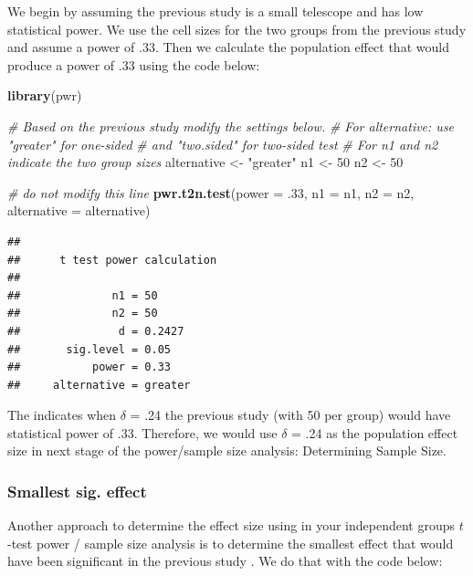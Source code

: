 \documentclass[
]{krantz}
\makeatletter
\newenvironment{Shaded}{\begin{snugshade}}{\end{snugshade}}
\newcommand{\CommentTok}[1]{\textcolor[rgb]{0.37,0.37,0.37}{\textit{#1}}}
\newcommand{\DataTypeTok}[1]{\textcolor[rgb]{0.27,0.27,0.27}{#1}}
\newcommand{\DecValTok}[1]{\textcolor[rgb]{0.06,0.06,0.06}{#1}}
\newcommand{\FloatTok}[1]{\textcolor[rgb]{0.06,0.06,0.06}{#1}}
\newcommand{\KeywordTok}[1]{\textcolor[rgb]{0.27,0.27,0.27}{\textbf{#1}}}
\newcommand{\NormalTok}[1]{#1}
\newcommand{\StringTok}[1]{\textcolor[rgb]{0.5,0.5,0.5}{#1}}
\newenvironment{kframe}{%
\medskip{}
\setlength{\fboxsep}{.8em}
 \def\at@end@of@kframe{}%
 \ifinner\ifhmode%
  \def\at@end@of@kframe{\end{minipage}}%
  \begin{minipage}{\columnwidth}%
 \fi\fi%
 \def\FrameCommand##1{\hskip\@totalleftmargin \hskip-\fboxsep
 \colorbox{shadecolor}{##1}\hskip-\fboxsep
     \hskip-\linewidth \hskip-\@totalleftmargin \hskip\columnwidth}%
 \MakeFramed {\advance\hsize-\width
   \@totalleftmargin\z@ \linewidth\hsize
   \@setminipage}}%
 {\par\unskip\endMakeFramed%
 \at@end@of@kframe}
\renewenvironment{Shaded}{\begin{kframe}}{\end{kframe}}
\makeatother
\begin{document}
We begin by assuming the previous study is a small telescope and has low statistical power. We use the cell sizes for the two groups from the previous study and assume a power of .33. Then we calculate the population effect that would produce a power of .33 using the code below:

\begin{Shaded}
\begin{Highlighting}[]
\KeywordTok{library}\NormalTok{(pwr)}

\CommentTok{# Based on the previous study modify the settings below.}
\CommentTok{# For alternative: use "greater" for one-sided }
\CommentTok{# and "two.sided" for two-sided test}
\CommentTok{# For n1 and n2 indicate the two group sizes}
\NormalTok{alternative <-}\StringTok{ "greater"}
\NormalTok{n1 <-}\StringTok{ }\DecValTok{50}
\NormalTok{n2 <-}\StringTok{ }\DecValTok{50}

\CommentTok{# do not modify this line}
\KeywordTok{pwr.t2n.test}\NormalTok{(}\DataTypeTok{power =} \FloatTok{.33}\NormalTok{,}
             \DataTypeTok{n1 =}\NormalTok{ n1, }
             \DataTypeTok{n2 =}\NormalTok{ n2, }
             \DataTypeTok{alternative =}\NormalTok{ alternative)}
\end{Highlighting}
\end{Shaded}

\begin{verbatim}
## 
##      t test power calculation 
## 
##              n1 = 50
##              n2 = 50
##               d = 0.2427
##       sig.level = 0.05
##           power = 0.33
##     alternative = greater
\end{verbatim}

The indicates when \(\delta\) = .24 the previous study (with 50 per group) would have statistical power of .33. Therefore, we would use \(\delta\) = .24 as the population effect size in next stage of the power/sample size analysis: Determining Sample Size.

\hypertarget{smallest-sig.-effect}{%
\subsubsection{Smallest sig. effect}\label{smallest-sig.-effect}}

Another approach to determine the effect size using in your independent groups \(t\)-test power / sample size analysis is to determine the smallest effect that would have been significant in the previous study \citep{lakens2018equivalence}. We do that with the code below:
\end{document}
